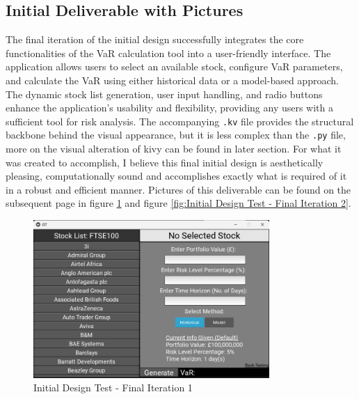 \documentclass{article}
\begin{document}
\subsection{Initial Deliverable with Pictures}
The final iteration of the initial design successfully integrates the core functionalities of the VaR calculation tool into a user-friendly interface. The application allows users to select an available stock, configure VaR parameters, and calculate the VaR using either historical data or a model-based approach. The dynamic stock list generation, user input handling, and radio buttons enhance the application's usability and flexibility, providing any users with a sufficient tool for risk analysis. The accompanying \texttt{.kv} file provides the structural backbone behind the visual appearance, but it is less complex than the \texttt{.py} file, more on the visual alteration of kivy can be found in later section. For what it was created to accomplish, I believe this final initial design is aesthetically pleasing, computationally sound and accomplishes exactly what is required of it in a robust and efficient manner. Pictures of this deliverable can be found on the subsequent page in figure \ref{fig:Initial Design Test - Final Iteration 1} and figure \ref{fig:Initial Design Test - Final Iteration 2}.

\begin{figure}[h!]
  \centering
  \includegraphics[width=0.8\textwidth]{Images/Initial Design Tes - Final Iteration 1.png}
  \caption{Initial Design Test - Final Iteration 1}
  \label{fig:Initial Design Test - Final Iteration 1}
\end{figure}
\end{document}
